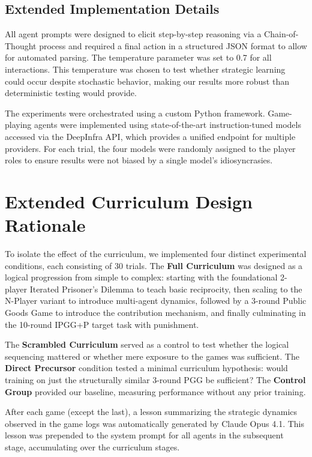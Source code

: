 \documentclass[11pt]{article}
\begin{document}
\subsection{Extended Implementation Details}
All agent prompts were designed to elicit step-by-step reasoning via a Chain-of-Thought process and required a final action in a structured JSON format to allow for automated parsing. The temperature parameter was set to 0.7 for all interactions. This temperature was chosen to test whether strategic learning could occur despite stochastic behavior, making our results more robust than deterministic testing would provide.

The experiments were orchestrated using a custom Python framework. Game-playing agents were implemented using state-of-the-art instruction-tuned models accessed via the DeepInfra API, which provides a unified endpoint for multiple providers. For each trial, the four models were randomly assigned to the player roles to ensure results were not biased by a single model's idiosyncrasies.


\section{Extended Curriculum Design Rationale}
\label{app:curriculum_rationale}

To isolate the effect of the curriculum, we implemented four distinct experimental conditions, each consisting of 30 trials. The \textbf{Full Curriculum} was designed as a logical progression from simple to complex: starting with the foundational 2-player Iterated Prisoner's Dilemma to teach basic reciprocity, then scaling to the N-Player variant to introduce multi-agent dynamics, followed by a 3-round Public Goods Game to introduce the contribution mechanism, and finally culminating in the 10-round IPGG+P target task with punishment.

The \textbf{Scrambled Curriculum} served as a control to test whether the logical sequencing mattered or whether mere exposure to the games was sufficient. The \textbf{Direct Precursor} condition tested a minimal curriculum hypothesis: would training on just the structurally similar 3-round PGG be sufficient? The \textbf{Control Group} provided our baseline, measuring performance without any prior training.

After each game (except the last), a lesson summarizing the strategic dynamics observed in the game logs was automatically generated by Claude Opus 4.1. This lesson was prepended to the system prompt for all agents in the subsequent stage, accumulating over the curriculum stages.
\end{document}

